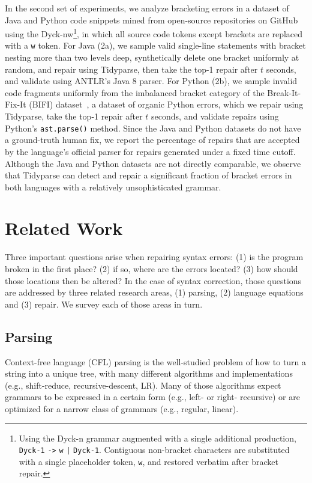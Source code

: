 \documentclass[sigplan,review,anonymous,acmsmall]{acmart}\settopmatter{printfolios=false,printccs=false,printacmref=false}
\begin{document}
  In the second set of experiments, we analyze bracketing errors in a dataset of Java and Python code snippets mined from open-source repositories on GitHub using the Dyck-nw\footnote{Using the Dyck-n grammar augmented with a single additional production, \texttt{Dyck-1} {\color{blue}\texttt{->}} \texttt{w} {\color{blue}\texttt{|}} \texttt{Dyck-1}. Contiguous non-bracket characters are substituted with a single placeholder token, \texttt{w}, and restored verbatim after bracket repair.}, in which all source code tokens except brackets are replaced with a \texttt{w} token. For Java (2a), we sample valid single-line statements with bracket nesting more than two levels deep, synthetically delete one bracket uniformly at random, and repair using Tidyparse, then take the top-1 repair after $t$ seconds, and validate using ANTLR's Java 8 parser. For Python (2b), we sample invalid code fragments uniformly from the imbalanced bracket category of the Break-It-Fix-It (BIFI) dataset~\cite{yasunaga2021break}, a dataset of organic Python errors, which we repair using Tidyparse, take the top-1 repair after $t$ seconds, and validate repairs using Python's \texttt{ast.parse()} method. Since the Java and Python datasets do not have a ground-truth human fix, we report the percentage of repairs that are accepted by the language's official parser for repairs generated under a fixed time cutoff. Although the Java and Python datasets are not directly comparable, we observe that Tidyparse can detect and repair a significant fraction of bracket errors in both languages with a relatively unsophisticated grammar.

  \section{Related Work}\label{sec:related}

  Three important questions arise when repairing syntax errors: (1) is the program broken in the first place? (2) if so, where are the errors located? (3) how should those locations then be altered? In the case of syntax correction, those questions are addressed by three related research areas, (1) parsing, (2) language equations and (3) repair. We survey each of those areas in turn.

  \subsection{Parsing}

  Context-free language (CFL) parsing is the well-studied problem of how to turn a string into a unique tree, with many different algorithms and implementations (e.g., shift-reduce, recursive-descent, LR). Many of those algorithms expect grammars to be expressed in a certain form (e.g., left- or right- recursive) or are optimized for a narrow class of grammars (e.g., regular, linear).
\end{document}
